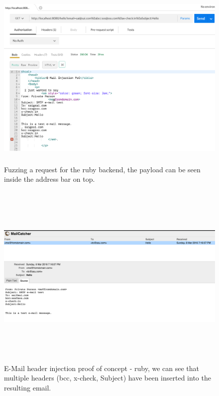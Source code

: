 \begin{figure}[!htbp]
	\centering
	\includegraphics[width=14cm, height=9cm]{System/EMI_Postman_Ruby}
	\caption{Fuzzing a request for the ruby backend, the payload can be seen inside the address bar on top.}
	\label{fig:postmanruby}
\end{figure}

\begin{figure}[!htbp]
	\centering
	\includegraphics[width=14cm, height=9cm]{System/EMI_Mailcatcher_Ruby}
	\caption{E-Mail header injection proof of concept - ruby, we can see that multiple headers (bcc, x-check, Subject) have been inserted into the resulting email.}
	\label{fig:mailcatcherruby}
\end{figure}

